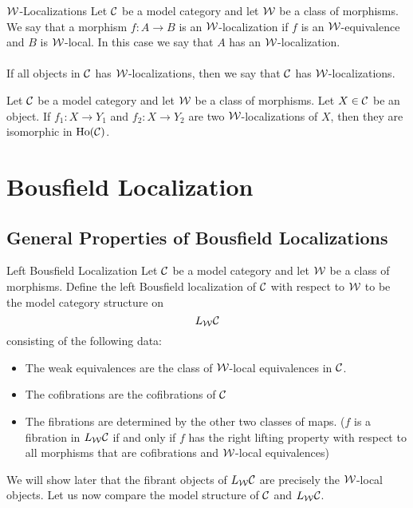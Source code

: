\documentclass[a4paper]{article}
\begin{document}
\begin{defn}{$\mathcal{W}$-Localizations}{} Let $\mathcal{C}$ be a model category and let $\mathcal{W}$ be a class of morphisms. We say that a morphism $f:A\to B$ is an $\mathcal{W}$-localization if $f$ is an $\mathcal{W}$-equivalence and $B$ is $\mathcal{W}$-local. In this case we say that $A$ has an $\mathcal{W}$-localization. \\~\\

If all objects in $\mathcal{C}$ has $\mathcal{W}$-localizations, then we say that $\mathcal{C}$ has $\mathcal{W}$-localizations. 
\end{defn}

\begin{prp}{}{} Let $\mathcal{C}$ be a model category and let $\mathcal{W}$ be a class of morphisms. Let $X\in\mathcal{C}$ be an object. If $f_1:X\to Y_1$ and $f_2:X\to Y_2$ are two $\mathcal{W}$-localizations of $X$, then they are isomorphic in $\text{Ho}(\mathcal{C})$. 
\end{prp}

\pagebreak
\section{Bousfield Localization}
\subsection{General Properties of Bousfield Localizations}
\begin{defn}{Left Bousfield Localization}{} Let $\mathcal{C}$ be a model category and let $\mathcal{W}$ be a class of morphisms. Define the left Bousfield localization of $\mathcal{C}$ with respect to $\mathcal{W}$ to be the model category structure on $$L_{\mathcal{W}}\mathcal{C}$$ consisting of the following data: 
\begin{itemize}
\item The weak equivalences are the class of $\mathcal{W}$-local equivalences in $\mathcal{C}$. 
\item The cofibrations are the cofibrations of $\mathcal{C}$
\item The fibrations are determined by the other two classes of maps. ($f$ is a fibration in $L_{\mathcal{W}}\mathcal{C}$ if and only if $f$ has the right lifting property with respect to all morphisms that are cofibrations and $\mathcal{W}$-local equivalences)
\end{itemize}
\end{defn}

We will show later that the fibrant objects of $L_{\mathcal{W}}\mathcal{C}$ are precisely the $\mathcal{W}$-local objects. Let us now compare the model structure of $\mathcal{C}$ and $L_{\mathcal{W}}\mathcal{C}$. 
\end{document}
